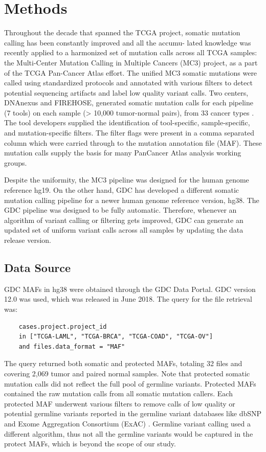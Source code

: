 \section{Methods}
Throughout the decade that spanned the TCGA project, somatic mutation calling has been constantly improved and all the accumu- lated knowledge was recently applied to a harmonized set of mutation calls across all TCGA samples: the Multi-Center Mutation Calling in Multiple Cancers (MC3) project, as a part of the TCGA Pan-Cancer Atlas effort. The unified MC3 somatic mutations were called using standardized protocols and annotated with various filters to detect potential sequencing artifacts and label low quality variant calls. Two centers, DNAnexus and FIREHOSE, generated somatic mutation calls for each pipeline (7 tools) on each sample (> 10,000 tumor-normal pairs), from 33 cancer types \cite{ellrottk_tcga:MC3MutationCalling2018}. The tool developers supplied the identification of tool-specific, sample-specific, and mutation-specific filters. The filter flags were present in a comma separated column which were carried through to the mutation annotation file (MAF). These mutation calls supply the basis for many PanCancer Atlas analysis working groups.

Despite the uniformity, the MC3 pipeline was designed for the human genome reference hg19. On the other hand, GDC has developed a different somatic mutation calling pipeline for a newer human genome reference version, hg38. The GDC pipeline was designed to be fully automatic. Therefore, whenever an algorithm of variant calling or filtering gets improved, GDC can generate an updated set of uniform variant calls across all samples by updating the data release version.

\subsection{Data Source}
GDC MAFs in hg38 were obtained through the GDC Data Portal. GDC version 12.0 was used, which was released in June 2018. The query for the file retrieval was:

\par\noindent\begin{verbatim}
    cases.project.project_id
    in ["TCGA-LAML", "TCGA-BRCA", "TCGA-COAD", "TCGA-OV"]
    and files.data_format = "MAF"
\end{verbatim}

The query returned both somatic and protected MAFs, totaling 32 files and covering 2,069 tumor and paired normal samples. Note that protected somatic mutation calls did not reflect the full pool of germline variants. Protected MAFs contained the raw mutation calls from all somatic mutation callers. Each protected MAF underwent various filters to remove calls of low quality or potential germline variants reported in the germline variant databases like dbSNP \cite{sherryst_sirotkink:dbSNP2001} and Exome Aggregation Consortium (ExAC) \cite{lekm_exomeaggregationconsortium:AnalysisProteincoding2016}. Germline variant calling used a different algorithm, thus not all the germline variants would be captured in the protect MAFs, which is beyond the scope of our study.

